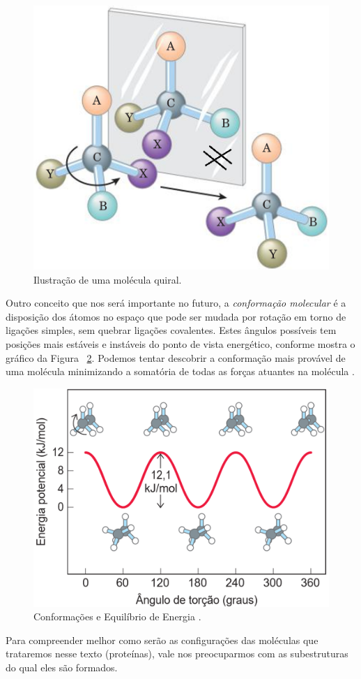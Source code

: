 \documentclass[a4paper,12pt]{article}
\begin{document}
	\begin{figure}[H]
		\begin{center}
			\includegraphics[width=0.45\linewidth]{quiral.png}
		\end{center}
		\caption{Ilustração de uma molécula quiral.}
		\label{fig:quiral}
	\end{figure} 
	
	 Outro conceito que nos será importante no futuro, a \textit{conformação molecular} é a disposição dos átomos no espaço que pode ser mudada por rotação em torno de ligações simples, sem quebrar ligações covalentes. Estes ângulos possíveis tem posições mais estáveis e instáveis do ponto de vista energético, conforme mostra o gráfico da Figura ~\ref{fig:carener}. Podemos tentar descobrir a conformação mais provável de uma molécula minimizando a somatória de todas as forças atuantes na molécula \cite{carlileTese}. 
	
	\begin{figure}[H]
		\begin{center}
			\includegraphics[width=0.55\linewidth]{carbonoenergia.png}
		\end{center}
		\caption{Conformações e Equilíbrio de Energia \cite{bioquimicaLehninger}.}
		\label{fig:carener}
	\end{figure} 
	
	Para compreender melhor como serão as configurações das moléculas que trataremos nesse texto (proteínas), vale nos preocuparmos com as subestruturas do qual eles são formados. 
	
\end{document}
